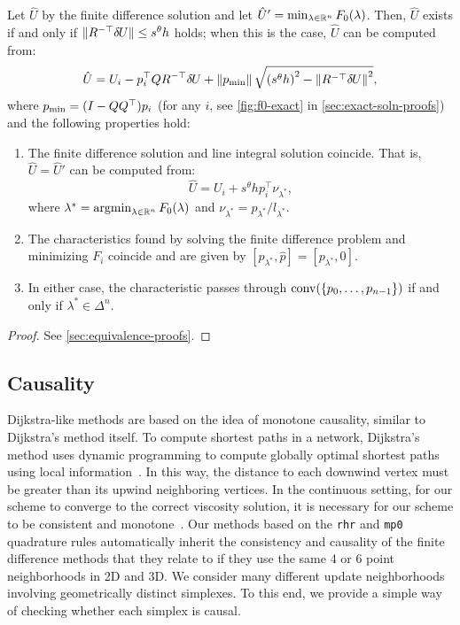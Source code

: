 \documentclass[sisc-eikonal.tex]{subfiles}
\begin{document}
\begin{theorem}\label{thm:equivalence}
  Let $\hat{U}$ by the finite difference solution and let
  $\hat{U}' = \min_{\lambda \in \mathbb{R}^n} F_0(\lambda)$. Then, $\hat{U}$
  exists if and only if $\|R^{-\top} {\delta \hspace{-0.09em} U}\| \leq s^\theta h$
  holds; when this is the case, $\hat{U}$ can be computed from:
  \begin{equation}
    \label{eq:U-finite-diff}
    \hat{U} = U_i - p_i^\top Q R^{-\top} \delU + \norm{\pmin} \sqrt{{(s^\theta h)}^2 - \norm{R^{-\top} \delU}^2},
  \end{equation}
  where $p_{\operatorname{min}} = (I - QQ^\top) p_i$ (for any $i$, see
  \cref{fig:f0-exact} in \cref{sec:exact-soln-proofs}) and the
  following properties hold:
  \begin{enumerate}
  \item The finite difference solution and line integral solution
    coincide. That is, $\hat{U} = \hat{U}'$ can be computed from:
    \begin{equation}
      \label{eq:U-from-Ui-exact}
      \hat{U} = U_i + s^\theta h p_i^\top \nu_{\lambda^*},
    \end{equation}
    where $\lambda^* = \operatorname{argmin}_{\lambda \in \mathbb{R}^n} F_0(\lambda)$ and
    $\nu_{\lambda^*} = p_{\lambda^*}/l_{\lambda^*}$.
  \item The characteristics found by solving the finite difference
    problem and minimizing $F_i$ coincide and are given by
    $[p_{\lambda^*}, \hat{p}] = [p_{\lambda^*}, 0]$.
  \item In either case, the characteristic passes through
    $\operatorname{conv}(\left\{p_0, \hdots, p_{n-1}\right\})$ if and only if
    $\lambda^* \in \Delta^n$.
  \end{enumerate}
\end{theorem}

\begin{proof}
  See \cref{sec:equivalence-proofs}.
\end{proof}

\subsection{Causality}\label{ssec:causality} Dijkstra-like
methods are based on the idea of monotone causality, similar to
Dijkstra's method itself. To compute shortest paths in a network,
Dijkstra's method uses dynamic programming to compute globally optimal
shortest paths using local information~\cite{dijkstra1959note}. In
this way, the distance to each downwind vertex must be greater than
its upwind neighboring vertices. In the continuous setting, for our
scheme to converge to the correct viscosity solution, it is necessary
for our scheme to be consistent and
monotone~\cite{crandall1983viscosity}. Our methods based on the
\texttt{rhr} and \texttt{mp0} quadrature rules automatically inherit
the consistency and causality of the finite difference methods that
they relate to if they use the same 4 or 6 point neighborhoods in 2D
and 3D. We consider many different update neighborhoods involving
geometrically distinct simplexes. To this end, we provide a simple way
of checking whether each simplex is causal.
\end{document}
